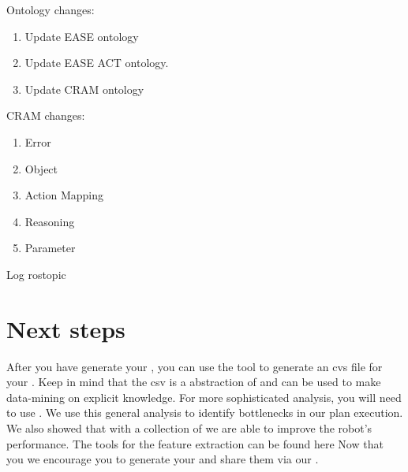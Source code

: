 Ontology changes:
\begin{enumerate}
	\item Update EASE ontology 
	\item Update EASE ACT ontology.
	\item Update CRAM ontology
\end{enumerate}

CRAM changes:
\begin{enumerate}
	\item Error
	\item Object
	\item Action Mapping
	\item Reasoning
	\item Parameter
\end{enumerate}

Log rostopic

\section{Next steps}
After you have generate your \neem, you can use the tool  to generate an cvs file for your \neem.
Keep in mind that the csv is a abstraction of \neemnar and can be used to make data-mining on explicit knowledge.
For more sophisticated analysis, you will need to use \knowrob. 
We use this general analysis to identify bottlenecks in our plan execution.
We also showed that with a collection of \neems we are able to improve the robot's performance.
The tools for the feature extraction can be found here 
Now that you we encourage you to generate your \neems and share them via our \neemhub.
